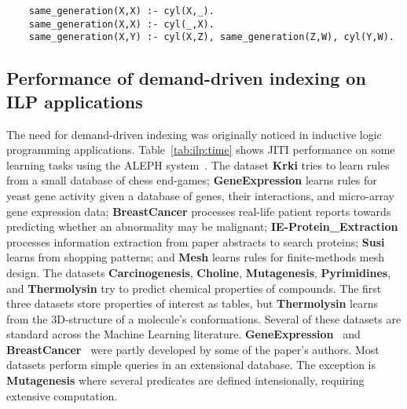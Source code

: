 \documentclass{llncs}
\newcommand{\JITI}{demand-driven indexing\xspace}
\newcommand{\bench}[1]{\textbf{\textsf{#1}}}
\newcommand{\BreastCancer}{\bench{BreastCancer}\xspace}
\newcommand{\Carcinogenesis}{\bench{Carcinogenesis}\xspace}
\newcommand{\Choline}{\bench{Choline}\xspace}
\newcommand{\GeneExpression}{\bench{GeneExpression}\xspace}
\newcommand{\IEProtein}{\bench{IE-Protein\_Extraction}\xspace}
\newcommand{\Krki}{\bench{Krki}\xspace}
\newcommand{\Mesh}{\bench{Mesh}\xspace}
\newcommand{\Mutagenesis}{\bench{Mutagenesis}\xspace}
\newcommand{\Pyrimidines}{\bench{Pyrimidines}\xspace}
\newcommand{\Susi}{\bench{Susi}\xspace}
\newcommand{\Thermolysin}{\bench{Thermolysin}\xspace}
\begin{document}
\begin{small}
  \begin{verbatim}
    same_generation(X,X) :- cyl(X,_).
    same_generation(X,X) :- cyl(_,X).
    same_generation(X,Y) :- cyl(X,Z), same_generation(Z,W), cyl(Y,W).
  \end{verbatim}
\end{small}


\subsection{Performance of \JITI on ILP applications} \label{sec:perf:ILP}
The need for \JITI was originally noticed in inductive logic
programming applications.
Table~\ref{tab:ilp:time} shows JITI performance on some learning tasks
using the ALEPH system~\cite{ALEPH}. The dataset \Krki tries to
learn rules from a small database of chess end-games;
\GeneExpression learns rules for yeast gene activity given a
database of genes, their interactions, and micro-array gene expression
data; \BreastCancer processes real-life patient reports towards
predicting whether an abnormality may be malignant;
\IEProtein processes information extraction from
paper abstracts to search proteins; \Susi learns from shopping
patterns; and \Mesh learns rules for finite-methods mesh
design. The datasets \Carcinogenesis, \Choline,
\Mutagenesis, \Pyrimidines, and \Thermolysin try to
predict chemical properties of compounds. The first three
datasets store properties of interest as tables, but
\Thermolysin learns from the 3D-structure of a molecule's
conformations. Several of these datasets are standard across the Machine
Learning literature. \GeneExpression~\cite{} and
\BreastCancer~\cite{} were partly developed by some of the
paper's authors. Most datasets perform simple queries in an
extensional database. The exception is \Mutagenesis where
several predicates are defined intensionally, requiring extensive
computation.
\end{document}
